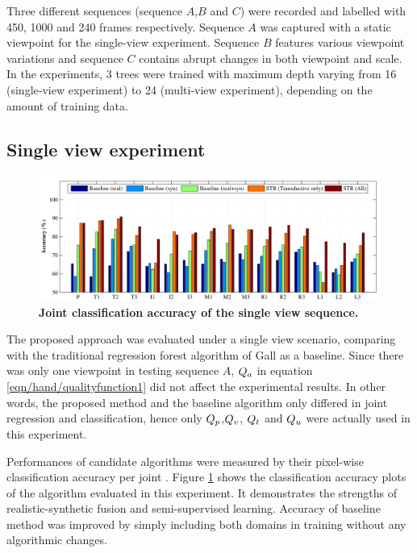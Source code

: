 Three different sequences (sequence $A$,$B$ and $C$) were recorded and labelled with 450, 1000 and 240 frames respectively.  Sequence $A$ was captured with a static viewpoint for the single-view experiment. Sequence $B$ features various viewpoint variations and sequence $C$ contains abrupt changes in both viewpoint and scale. In the experiments, 3 trees were trained with maximum depth varying from 16 (single-view experiment) to 24 (multi-view experiment), depending on the amount of training data.

\subsection{Single view experiment} 

\begin{figure}[ht]
	\centering
	\includegraphics[width=1\linewidth]{fig/hand/singleview.pdf}
	\caption{\textbf{Joint classification accuracy of the single view sequence.}}
	\label{fig/hand/single}
\end{figure}

The proposed approach was evaluated under a single view scenario, comparing with the traditional regression forest algorithm of Gall \etal \cite{Gall2011} as a baseline. Since there was only one viewpoint in testing sequence $A$, $Q_{a}$ in equation \ref{eqn/hand/qualityfunction1} did not affect the experimental results. In other words, the proposed method and the baseline algorithm only differed in joint regression and classification, hence only $Q_{p}$,$Q_{v}$, $Q_{t}$ and $Q_{u}$ were actually used in this experiment.    

Performances of candidate algorithms were measured by their pixel-wise classification accuracy per joint \cite{Shotton2011}. Figure \ref{fig/hand/single} shows the classification accuracy plots of the algorithm evaluated in this experiment.  
It demonstrates the strengths of realistic-synthetic fusion and semi-supervised learning. 
Accuracy of baseline method was improved by simply including both domains in training without any algorithmic changes. 

